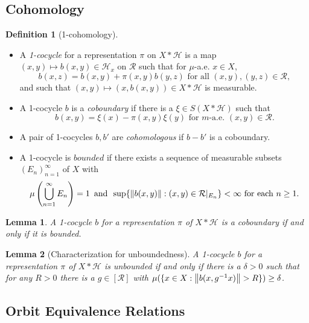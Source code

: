 \documentclass[12pt]{article}
\newcommand{\lr}[1]{\left(#1\right)}
\renewcommand{\H}{\mathcal{H}}
\theoremstyle{definition}
\newtheorem{definition}{Definition}[]
\theoremstyle{plain}
\newtheorem{lemma}{Lemma}[]
\theoremstyle{remark}
\begin{document}
\subsection{Cohomology}

\begin{definition}[1-cohomology]\ \\
    \begin{itemize}
        \item A \textit{1-cocycle} for a representation $ \pi $ on $ X\ast\H $ is a map $ (x,y)\mapsto b(x,y)\in \H_{x} $ on $ \mathcal{R} $ such that for $ \mu $-a.e. $ x\in X $,
        \[
            b(x,z) = b(x,y) + \pi(x,y)b(y,z) \text{ for all } (x,y), (y,z) \in \mathcal{R},
        \]
        and such that $ (x,y)\mapsto(x,b(x,y))\in X\ast\H $ is measurable.
        \item A 1-cocycle $ b $ is a \textit{coboundary} if there is a $ \xi\in S(X\ast\H) $ such that 
        \[
            b(x,y) = \xi(x)-\pi(x,y) \xi(y) \text{ for }  m\text{-a.e. } (x,y)\in \mathcal{R}.
        \]
        \item A pair of 1-cocycles $ b,b ' $ are \textit{cohomologous} if $ b-b ' $ is a coboundary.
        \item A 1-cocycle is $ bounded $ if there exists a sequence of measurable subsets $ (E_{n})_{n=1}^{\infty} $ of $ X $ with 
        \[
            \mu\lr{\bigcup_{n=1}^{\infty}E_{n}} = 1\,\,\,\text{and}\,\,\, \sup\{\norm{b(x,y)}: (x,y)\in \mathcal{R}\vert_{E_{n}}\} < \infty \text{ for each } n\geq 1.
        \]
    \end{itemize}
\end{definition}


\begin{lemma}
    A 1-cocycle $ b $ for a representation $ \pi $ of $ X\ast\H $ is a coboundary if and only if it is bounded.
\end{lemma}

\begin{lemma}[Characterization for unboundedness]
    A 1-cocycle $ b $ for a representation $ \pi $ of $ X\ast\H $ is unbounded if and only if there is a $ \delta>0 $  such that for any $ R>0 $ there is a $ g\in[\mathcal{R}] $ with $ \mu(\{x\in X: \norm{ b(x,g^{-1}x)}>R\}) \geq \delta $.
\end{lemma}

\subsection{Orbit Equivalence Relations}
\end{document}

